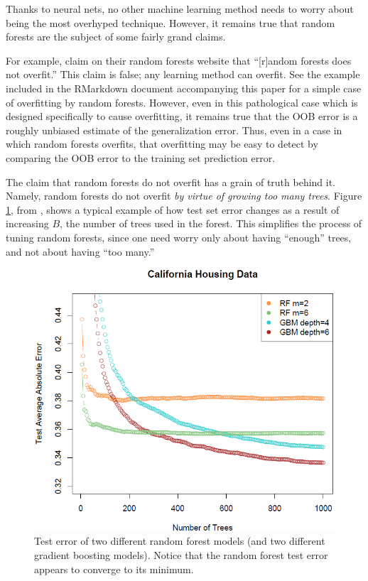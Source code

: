 \documentclass[10pt,a4paper]{article}
\begin{document}
Thanks to neural nets, no other machine learning method needs to worry about being the most overhyped technique. However, it remains true that random forests are the subject of some fairly grand claims.

For example, \citeauthor{breiman_cutler} claim on their random forests website that ``[r]andom forests does not overfit.'' This claim is false; any learning method can overfit. See the example included in the RMarkdown document accompanying this paper for a simple case of overfitting by random forests. However, even in this pathological case which is designed specifically to cause overfitting, it remains true that the OOB error is a roughly unbiased estimate of the generalization error. Thus, even in a case in which random forests overfits, that overfitting may be easy to detect by comparing the OOB error to the training set prediction error.

The claim that random forests do not overfit has a grain of truth behind it. Namely, random forests do not overfit \emph{by virtue of growing too many trees}. Figure \ref{fig:error}, from \citet{Hastie2009}, shows a typical example of how test set error changes as a result of increasing $B$, the number of trees used in the forest. This simplifies the process of tuning random forests, since one need worry only about having ``enough'' trees, and not about having ``too many.''

\begin{figure}
	\centering
	\includegraphics[width=0.8\linewidth]{comp3}
	\caption{Test error of two different random forest models (and two different gradient boosting models). Notice that the random forest test error appears to converge to its minimum.}
	\label{fig:error}
\end{figure}
\end{document}
